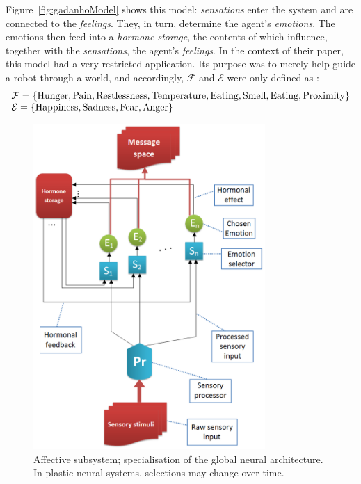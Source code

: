 Figure~\ref{fig:gadanhoModel} shows this model: \emph{sensations} enter the system and are connected to the \emph{feelings}. They, in turn, determine the agent's \emph{emotions}. The emotions then feed into a \emph{hormone storage}, the contents of which influence, together with the \emph{sensations}, the agent's \emph{feelings}. In the context of their paper, this model had a very restricted application. Its purpose was to merely help guide a robot through a world, and accordingly, $\mathcal{F}$ and $\mathcal{E}$ were only defined as \cite[p.\ 47]{DBLP:journals/adb/GadanhoH01}:
$$
	\begin{array}{l}
		\mathcal{F} = \{ \textnormal{Hunger}, \textnormal{Pain}, \textnormal{Restlessness},
						 \textnormal{Temperature}, \textnormal{Eating}, \textnormal{Smell},
						 \textnormal{Eating}, \textnormal{Proximity} \}\\
		\mathcal{E} = \{ \textnormal{Happiness}, \textnormal{Sadness}, \textnormal{Fear},
						 \textnormal{Anger} \}
	\end{array}
$$

\begin{figure}[t]
	\centering
	\includegraphics[width=250pt]{Figs/affectiveSubsystem.png}
	\caption{Affective subsystem; specialisation of the global neural architecture. In plastic neural systems, selections may change over time.}
	\label{fig:affectiveSubsystem}
\end{figure}


